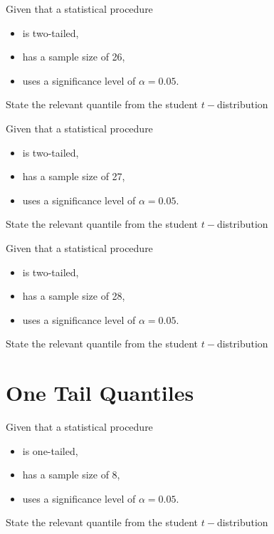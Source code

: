 \documentclass[12pt, a4paper]{report}
\theoremstyle{definition}
\theoremstyle{remark}
\begin{document}

	
	
	
	Given that a statistical procedure 
	\begin{itemize}
		\item is two-tailed,
		\item has a sample size of 26,
		\item uses a significance level of $\alpha = 0.05$.
	\end{itemize} \smallskip
	State the relevant quantile from the student $t-$distribution
	


	
	
	
	Given that a statistical procedure
	\begin{itemize}
		\item is two-tailed,
		\item has a sample size of 27,
		\item uses a significance level of $\alpha = 0.05$.
	\end{itemize} \smallskip
	State the relevant quantile from the student $t-$distribution
	


	
	
	
	Given that a statistical procedure 
	\begin{itemize}
		\item is two-tailed,
		\item has a sample size of 28,
		\item uses a significance level of $\alpha = 0.05$.
	\end{itemize} \smallskip
	State the relevant quantile from the student $t-$distribution
	

\section{One Tail Quantiles}


	
	
	
	Given that a statistical procedure 
	\begin{itemize}
		\item is one-tailed,
		\item has a sample size of 8,
		\item uses a significance level of $\alpha = 0.05$.
	\end{itemize} \smallskip
	State the relevant quantile from the student $t-$distribution
	
\end{document}
